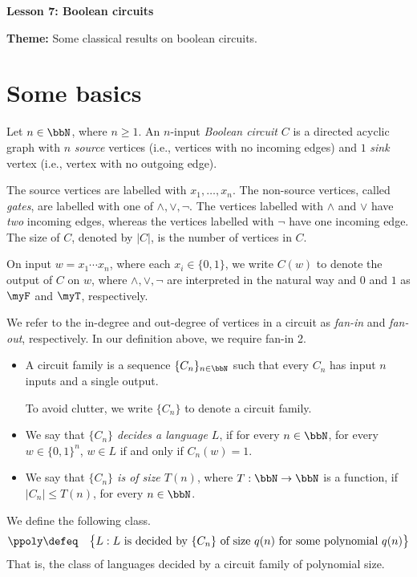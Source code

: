 \documentclass[11pt, a4paper]{article}
\renewcommand{\lesson}{7}
\renewcommand{\lessontitle}{Boolean circuits}
\renewcommand{\fulltitle}{Lesson \lesson: \lessontitle}
\begin{document}
\date{}



\begin{center}
{\Large {\bf \fulltitle}}
\end{center}
\vspace{0.5cm}

\noindent
{\bf Theme:} Some classical results on boolean circuits.



\section{Some basics}


Let $n\in \bbN$, where $n\geq 1$.
An $n$-input {\em Boolean circuit} $C$ is a directed acyclic graph with
$n$ {\em source} vertices (i.e., vertices with no incoming edges) and 
$1$ {\em sink} vertex (i.e., vertex with no outgoing edge).

The source vertices are labelled with $x_1,\ldots,x_n$.
The non-source vertices, called {\em gates},
are labelled with one of $\wedge, \vee,\neg$.
The vertices labelled with $\wedge$ and $\vee$ have {\em two} incoming edges,
whereas the vertices labelled with $\neg$ have one incoming edge.
The size of $C$, denoted by $|C|$, is the number of vertices in $C$.

On input $w = x_1\cdots x_n$, where each $x_i \in \{0,1\}$,
we write $C(w)$ to denote the output of $C$ on $w$,
where $\wedge,\vee,\neg$ are interpreted in the natural way
and $0$ and $1$ as $\myF$ and $\myT$, respectively.

We refer to the in-degree and out-degree of vertices in a circuit as {\em fan-in} and {\em fan-out}, respectively.
In our definition above, we require fan-in 2.

\begin{itemize}
\item
A circuit family is a sequence $\{C_n\}_{n\in \bbN}$ such that every $C_n$ has input $n$ inputs and a single output.

To avoid clutter, we write $\{C_n\}$ to denote a circuit family.
\item 
We say that {\em $\{C_n\}$ decides a language $L$},
if for every $n\in\bbN$, for every $w\in \{0,1\}^n$, $w\in L$ if and only if $C_n(w)=1$.

\item
We say that {\em $\{C_n\}$ is of size $T(n)$}, where $T:\bbN\to\bbN$ is a function,
if $|C_n|\leq T(n)$, for every $n\in \bbN$.

\end{itemize}
We define the following class.
\begin{eqnarray*}
\ppoly & \defeq &
\big\{L : L \ \text{is decided by}\ \{C_n\} \ \text{of size}\ q(n) \ \text{for some polynomial}\ q(n)\big\} 
\end{eqnarray*}
That is, the class of languages decided by a circuit family of polynomial size.
\end{document}
